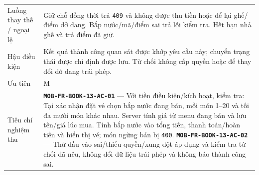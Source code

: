 \begin{longtable}{@{}P{0.23000\SRSWidth}P{0.77000\SRSWidth}@{}}
Luồng thay thế /\allowbreak{} ngoại lệ & Giữ chỗ đồng thời trả \texttt{409} và không được thu tiền hoặc để lại ghế/\allowbreak{}điểm dở dang. Bắp nước/\allowbreak{}mã/\allowbreak{}điểm sai trả lỗi kiểm tra. Hết hạn nhả ghế và trả điểm đã giữ. \\[3pt]
Hậu điều kiện & Kết quả thành công quan sát được khớp yêu cầu này; chuyển trạng thái được chỉ định được lưu. Từ chối không cấp quyền hoặc để thay đổi dở dang trái phép. \\[3pt]
Ưu tiên & M \\[3pt]
Tiêu chí nghiệm thu & \textbf{\texttt{MOB-\allowbreak{}FR-\allowbreak{}BOOK-\allowbreak{}13-\allowbreak{}AC-\allowbreak{}01}} — Với tiền điều kiện/\allowbreak{}kích hoạt, kiểm tra: Tại xác nhận đặt vé chọn bắp nước đang bán, mỗi món 1–20 và tối đa mười món khác nhau. Server tính giá từ menu đang bán và lưu tên/\allowbreak{}giá lúc mua. Tính bắp nước vào tổng tiền, thanh toán/\allowbreak{}hoàn tiền và hiển thị vé; món ngừng bán bị \texttt{400}. \textbf{\texttt{MOB-\allowbreak{}FR-\allowbreak{}BOOK-\allowbreak{}13-\allowbreak{}AC-\allowbreak{}02}} — Thử đầu vào sai/\allowbreak{}thiếu quyền/\allowbreak{}xung đột áp dụng và kiểm tra từ chối đã nêu, không đổi dữ liệu trái phép và không báo thành công sai. \\[3pt]

\end{longtable}

